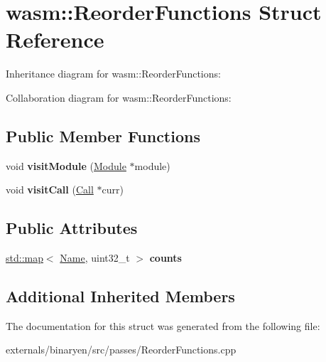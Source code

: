 \hypertarget{structwasm_1_1_reorder_functions}{}\section{wasm\+:\+:Reorder\+Functions Struct Reference}
\label{structwasm_1_1_reorder_functions}


Inheritance diagram for wasm\+:\+:Reorder\+Functions\+:


Collaboration diagram for wasm\+:\+:Reorder\+Functions\+:
\subsection*{Public Member Functions}
\begin{DoxyCompactItemize}
\item 
\mbox{\label{structwasm_1_1_reorder_functions_ac25426fb12932fdaee9f14b42f818902}} 
void {\bfseries visit\+Module} (\mbox{\hyperlink{classwasm_1_1_module}{Module}} $\ast$module)
\item 
\mbox{\label{structwasm_1_1_reorder_functions_aa73fd018789c53252ffb7da1c6307b34}} 
void {\bfseries visit\+Call} (\mbox{\hyperlink{classwasm_1_1_call}{Call}} $\ast$curr)
\end{DoxyCompactItemize}
\subsection*{Public Attributes}
\begin{DoxyCompactItemize}
\item 
\mbox{\label{structwasm_1_1_reorder_functions_af6b2dd4272f5637713b25d06e1df309a}} 
\mbox{\hyperlink{classstd_1_1map}{std\+::map}}$<$ \mbox{\hyperlink{structwasm_1_1_name}{Name}}, uint32\+\_\+t $>$ {\bfseries counts}
\end{DoxyCompactItemize}
\subsection*{Additional Inherited Members}


The documentation for this struct was generated from the following file\+:\begin{DoxyCompactItemize}
\item 
externals/binaryen/src/passes/Reorder\+Functions.\+cpp\end{DoxyCompactItemize}
